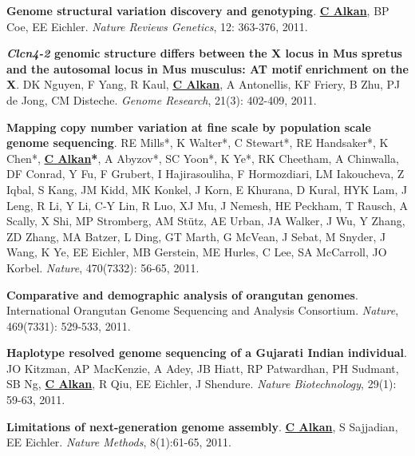 \vspace{-.2cm}
{\bf Genome structural variation discovery and genotyping}. 
{\bf {\underline {C Alkan}}}, BP Coe, EE Eichler.
{\em Nature Reviews Genetics}, 12: 363-376, 2011.


\vspace{-.2cm}
{\bf {\em Clcn4-2} genomic structure differs between the X locus in Mus spretus and the autosomal 
locus in Mus musculus: AT motif enrichment on the X}.  
DK Nguyen, F Yang, R Kaul, {\bf {\underline {C Alkan}}}, A Antonellis, KF Friery, 
B Zhu, PJ de Jong, CM Disteche. 
{\em Genome Research}, 21(3): 402-409, 2011.

\vspace{-.2cm}
{\bf Mapping copy number variation at fine scale by population scale genome sequencing}.
RE Mills*, K Walter*, C Stewart*, RE Handsaker*, K Chen*, 
{\bf {\underline {C Alkan}*}}, A Abyzov*, SC Yoon*, K Ye*, RK Cheetham, 
A Chinwalla, DF Conrad, Y Fu, F Grubert, I Hajirasouliha, 
F Hormozdiari, LM Iakoucheva, Z Iqbal, S Kang, JM Kidd, 
MK Konkel, J Korn, E Khurana, D Kural, HYK Lam, J Leng, 
R Li, Y Li, C-Y Lin, R Luo, XJ Mu, J Nemesh,
HE Peckham, T Rausch, A Scally, X Shi, MP Stromberg, 
AM St\"{u}tz, AE Urban, JA Walker, J Wu, Y Zhang, 
ZD Zhang, MA Batzer, L Ding, GT Marth, G McVean, 
J Sebat, M Snyder, J Wang, K Ye, EE Eichler, 
MB Gerstein, ME Hurles, C Lee, SA McCarroll,  JO Korbel.
{\em Nature}, 470(7332): 56-65, 2011.

\vspace{-.2cm}
{\bf Comparative and demographic analysis of orangutan genomes}. 
International Orangutan Genome Sequencing and Analysis Consortium.
{\em Nature}, 469(7331): 529-533, 2011.

\vspace{-.2cm}
{\bf Haplotype resolved genome sequencing of a Gujarati Indian individual}.
JO Kitzman, AP MacKenzie, A Adey, JB Hiatt, RP Patwardhan, 
PH Sudmant, SB Ng, {\bf {\underline{C Alkan}}}, R Qiu, EE
Eichler, J Shendure.
{\em Nature Biotechnology}, 29(1): 59-63, 2011.

\vspace{-.2cm}
{\bf Limitations of next-generation genome assembly}.
{\bf {\underline {C Alkan}}}, S Sajjadian, EE Eichler.
{\em Nature Methods}, 8(1):61-65, 2011. \\



